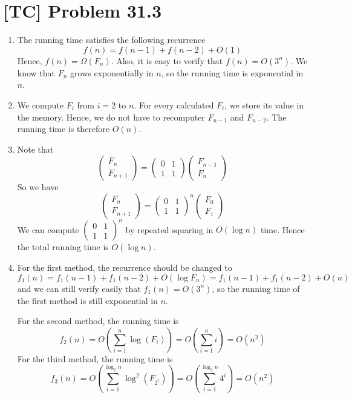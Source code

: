 \documentclass[a4paper,11pt]{article}
\begin{document}
  \section{[TC] Problem 31.3}
  \begin{enumerate}
    \item The running time satisfies the following recurrence
    $$ f(n) = f(n-1) + f(n-2) + O(1) $$
    Hence, $f(n) = \Omega(F_n)$. Also, it is easy to verify that $f(n) = O(3^n)$. We know that $F_n$ grows exponentially in $n$, so the running time is exponential in $n$.
    \item We compute $F_i$ from $i = 2$ to $n$. For every calculated $F_i$, we store its value in the memory. Hence, we do not have to recomputer $F_{n-1}$ and $F_{n-2}$. The running time is therefore $O(n)$.
    \item Note that
    \begin{equation*}
      \begin{pmatrix} F_n \\ F_{n+1} \end{pmatrix} =
      \begin{pmatrix} 0 & 1 \\ 1 & 1 \end{pmatrix} \begin{pmatrix} F_{n-1} \\ F_{n} \end{pmatrix}
    \end{equation*}
    So we have
    \begin{equation*}
      \begin{pmatrix} F_n \\ F_{n+1} \end{pmatrix} =
      \begin{pmatrix} 0 & 1 \\ 1 & 1 \end{pmatrix}^n \begin{pmatrix} F_{0} \\ F_{1} \end{pmatrix}
    \end{equation*}
    We can compute $\begin{pmatrix} 0 & 1 \\ 1 & 1 \end{pmatrix}^n $ by repeated squaring in $O(\log n)$ time. Hence the total running time is $O(\log n)$.
    \item For the first method, the recurrence should be changed to
    $$ f_1(n) = f_1(n-1) + f_1(n-2) + O(\log F_n) = f_1(n-1) + f_1(n-2) + O(n) $$
    and we can still verify easily that $f_1(n) = O(3^n)$, so the running time of the first method is still exponential in $n$. \par
    For the second method, the running time is
    $$ f_2(n) = O(\sum_{i = 1}^{n} \log(F_i)) = O(\sum_{i = 1}^n i) = O(n^2) $$
    For the third method, the running time is
    $$ f_3(n) = O(\sum_{i = 1}^{\log_2 n} \log^2(F_{2^i})) = O(\sum_{i = 1}^{\log_2 n} 4^i) = O(n^2) $$
  \end{enumerate}
\end{document}
